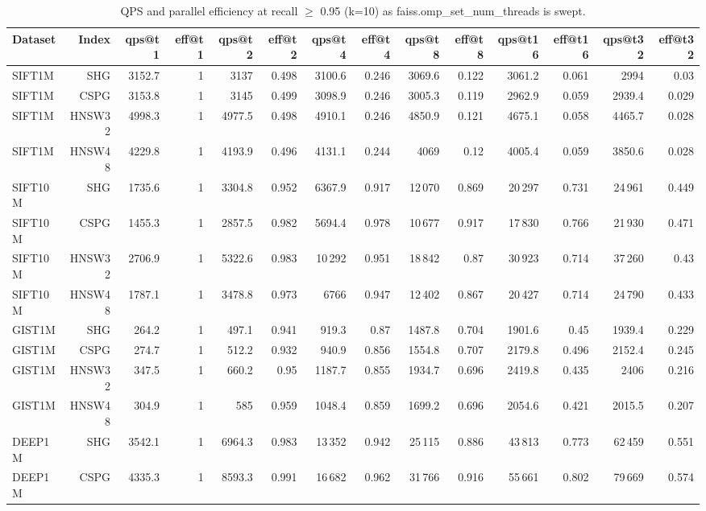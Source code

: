 \begin{table}[t]
\centering
\small
\caption{QPS and parallel efficiency at recall $\geq$ 0.95 (k=10) as faiss.omp\_set\_num\_threads is swept.}
\label{tab:thread-scaling-r95}
\begin{tabular}{lrrrrrrrrrrrrr}
\toprule
Dataset & Index & qps@t1 & eff@t1 & qps@t2 & eff@t2 & qps@t4 & eff@t4 & qps@t8 & eff@t8 & qps@t16 & eff@t16 & qps@t32 & eff@t32 \\
\midrule
SIFT1M & SHG & 3152.7 & 1 & 3137 & 0.498 & 3100.6 & 0.246 & 3069.6 & 0.122 & 3061.2 & 0.061 & 2994 & 0.03 \\
SIFT1M & CSPG & 3153.8 & 1 & 3145 & 0.499 & 3098.9 & 0.246 & 3005.3 & 0.119 & 2962.9 & 0.059 & 2939.4 & 0.029 \\
SIFT1M & HNSW32 & 4998.3 & 1 & 4977.5 & 0.498 & 4910.1 & 0.246 & 4850.9 & 0.121 & 4675.1 & 0.058 & 4465.7 & 0.028 \\
SIFT1M & HNSW48 & 4229.8 & 1 & 4193.9 & 0.496 & 4131.1 & 0.244 & 4069 & 0.12 & 4005.4 & 0.059 & 3850.6 & 0.028 \\
SIFT10M & SHG & 1735.6 & 1 & 3304.8 & 0.952 & 6367.9 & 0.917 & 12\,070 & 0.869 & 20\,297 & 0.731 & 24\,961 & 0.449 \\
SIFT10M & CSPG & 1455.3 & 1 & 2857.5 & 0.982 & 5694.4 & 0.978 & 10\,677 & 0.917 & 17\,830 & 0.766 & 21\,930 & 0.471 \\
SIFT10M & HNSW32 & 2706.9 & 1 & 5322.6 & 0.983 & 10\,292 & 0.951 & 18\,842 & 0.87 & 30\,923 & 0.714 & 37\,260 & 0.43 \\
SIFT10M & HNSW48 & 1787.1 & 1 & 3478.8 & 0.973 & 6766 & 0.947 & 12\,402 & 0.867 & 20\,427 & 0.714 & 24\,790 & 0.433 \\
GIST1M & SHG & 264.2 & 1 & 497.1 & 0.941 & 919.3 & 0.87 & 1487.8 & 0.704 & 1901.6 & 0.45 & 1939.4 & 0.229 \\
GIST1M & CSPG & 274.7 & 1 & 512.2 & 0.932 & 940.9 & 0.856 & 1554.8 & 0.707 & 2179.8 & 0.496 & 2152.4 & 0.245 \\
GIST1M & HNSW32 & 347.5 & 1 & 660.2 & 0.95 & 1187.7 & 0.855 & 1934.7 & 0.696 & 2419.8 & 0.435 & 2406 & 0.216 \\
GIST1M & HNSW48 & 304.9 & 1 & 585 & 0.959 & 1048.4 & 0.859 & 1699.2 & 0.696 & 2054.6 & 0.421 & 2015.5 & 0.207 \\
DEEP1M & SHG & 3542.1 & 1 & 6964.3 & 0.983 & 13\,352 & 0.942 & 25\,115 & 0.886 & 43\,813 & 0.773 & 62\,459 & 0.551 \\
DEEP1M & CSPG & 4335.3 & 1 & 8593.3 & 0.991 & 16\,682 & 0.962 & 31\,766 & 0.916 & 55\,661 & 0.802 & 79\,669 & 0.574 \\

\end{tabular}
\end{table}
